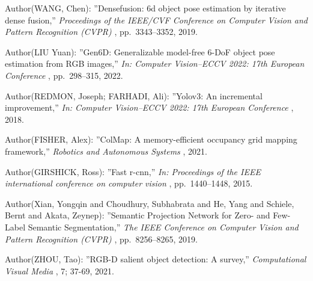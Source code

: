 \begin{thebibliography}{9}
		Author(WANG, Chen):
			''Densefusion: 6d object pose estimation by iterative dense fusion,''
			{\it Proceedings of the IEEE/CVF Conference on Computer Vision and Pattern Recognition (CVPR)}
			, pp.~3343--3352, 2019.

	Author(LIU Yuan):
		''Gen6D: Generalizable model-free 6-DoF object pose estimation from RGB images,''
		{\it In: Computer Vision–ECCV 2022: 17th European Conference}
		, pp.~298--315, 2022.
			
	Author(REDMON, Joseph; FARHADI, Ali):
		''Yolov3: An incremental improvement,''
		{\it In: Computer Vision–ECCV 2022: 17th European Conference}
		, 2018.

	Author(FISHER, Alex):
		''ColMap: A memory-efficient occupancy grid mapping framework,''
		{\it Robotics and Autonomous Systems}
		, 2021.

	Author(GIRSHICK, Ross):
		''Fast r-cnn,''
		{\it In: Proceedings of the IEEE international conference on computer vision}
		, pp.~1440--1448, 2015.

	Author(Xian, Yongqin and Choudhury, Subhabrata and He, Yang and Schiele, Bernt and Akata, Zeynep):
		''Semantic Projection Network for Zero- and Few-Label Semantic Segmentation,''
		{\it The IEEE Conference on Computer Vision and Pattern Recognition (CVPR)}
		, pp.~8256--8265, 2019.

	Author(ZHOU, Tao):
		''RGB-D salient object detection: A survey,''
		{\it Computational Visual Media}
		, 7; 37-69, 2021.


\end{thebibliography}
